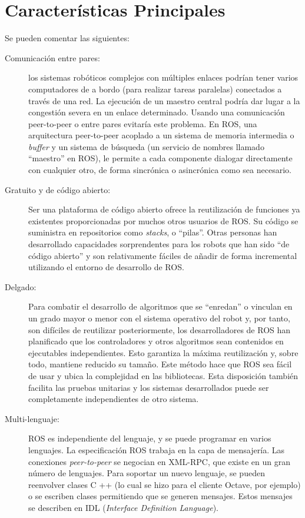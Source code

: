 \section{Características Principales}

Se pueden comentar las siguientes:

\begin{description}
	\item[Comunicación entre pares:] los sistemas robóticos complejos con múltiples enlaces podrían tener varios computadores de a bordo (para realizar tareas paralelas) conectados a través de una red. La ejecución de un maestro central podría dar lugar a la congestión severa en un enlace determinado. Usando una comunicación peer-to-peer o entre pares evitaría este problema. En ROS, una arquitectura peer-to-peer acoplado a un sistema de memoria intermedia o \textit{buffer} y un sistema de búsqueda (un servicio de nombres llamado ``maestro'' en ROS), le permite a cada componente dialogar directamente con cualquier otro, de forma sincrónica o asincrónica como sea necesario.

	\item[Gratuito y de código abierto:] Ser una plataforma de código abierto ofrece la reutilización de funciones ya existentes proporcionadas por muchos otros usuarios de ROS. Su código se suministra en repositorios como \textit{stacks}, o ``pilas''. Otras personas han desarrollado capacidades sorprendentes para los robots que han sido ``de código abierto'' y son relativamente fáciles de añadir de forma incremental utilizando el entorno de desarrollo de ROS.

	\item[Delgado:] Para combatir el desarrollo de algoritmos que se ``enredan'' o vinculan en un grado mayor o menor con el sistema operativo del robot y, por tanto, son difíciles de reutilizar posteriormente, los desarrolladores de ROS han planificado que los controladores y otros algoritmos sean contenidos en ejecutables independientes. Esto garantiza la máxima reutilización y, sobre todo, mantiene reducido su tamaño. Este método hace que ROS sea fácil de usar y ubica la complejidad en las bibliotecas. Esta disposición también facilita las pruebas unitarias y los sistemas desarrollados puede ser completamente independientes de otro sistema.

	\item[Multi-lenguaje:] ROS es independiente del lenguaje, y se puede programar en varios lenguajes. La especificación ROS trabaja en la capa de mensajería. Las conexiones \textit{peer-to-peer} se negocian en XML-RPC, que existe en un gran número de lenguajes. Para soportar un nuevo lenguaje, se pueden reenvolver clases C ++ (lo cual se hizo para el cliente Octave, por ejemplo) o se escriben clases permitiendo que se generen mensajes. Estos mensajes se describen en IDL (\textit{Interface Definition Language}). \cite{quigley2009ros}
\end{description}

